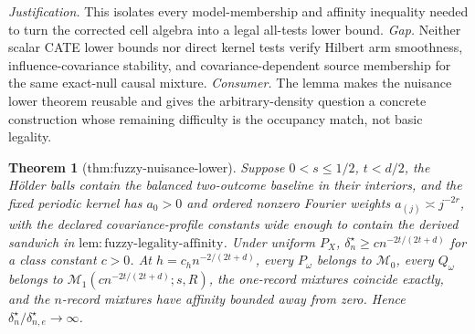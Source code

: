 \documentclass{article}
\newtheorem{theorem}{Theorem}
\begin{document}
\par\smallskip\noindent \textit{Justification.} This isolates every model-membership and affinity inequality needed to turn the corrected cell algebra into a legal all-tests lower bound. \textit{Gap.} Neither scalar CATE lower bounds nor direct kernel tests verify Hilbert arm smoothness, influence-covariance stability, and covariance-dependent source membership for the same exact-null causal mixture. \textit{Consumer.} The lemma makes the nuisance lower theorem reusable and gives the arbitrary-density question a concrete construction whose remaining difficulty is the occupancy match, not basic legality.

\begin{theorem}[thm:fuzzy-nuisance-lower]\label{thm:fuzzy-nuisance-lower}
Suppose \(0<s\le1/2\), \(t<d/2\), the Hölder balls contain the balanced two-outcome baseline in their interiors, and the fixed periodic kernel has \(a_0>0\) and ordered nonzero Fourier weights \(a_{(j)}\asymp j^{-2r}\), with the declared covariance-profile constants wide enough to contain the derived sandwich in \(\mathrm{lem{:}fuzzy\mbox{-}legality\mbox{-}affinity}\). Under uniform \(P_X\), \(\delta_n^\star\ge c n^{-2t/(2t+d)}\) for a class constant \(c>0\). At \(h=c_hn^{-2/(2t+d)}\), every \(P_\omega\) belongs to \(\mathcal M_0\), every \(Q_\omega\) belongs to \(\mathcal M_1(cn^{-2t/(2t+d)};s,R)\), the one-record mixtures coincide exactly, and the \(n\)-record mixtures have affinity bounded away from zero. Hence \(\delta_n^\star/\delta_{n,e}^\star\to\infty\).
\end{theorem}
\end{document}
